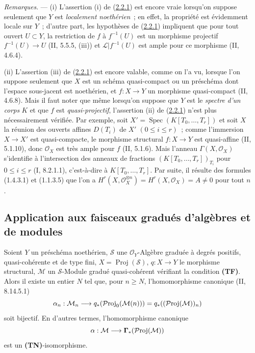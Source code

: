 \begin{env}[2.2.5]
\label{III.2.2.5-fr}
\emph{Remarques.} ---
(i) L'assertion (i) de (\hyperref[III.2.2.1-fr]{2.2.1}) est encore vraie
lorsqu'on suppose seulement que $Y$ est \emph{localement noethérien}~; en
effet, la propriété est évidemment locale sur $Y$~; d'autre part, les
hypothèses de (\hyperref[III.2.2.1-fr]{2.2.1}) impliquent que pour tout
ouvert $U\subset Y$, la restriction de $f$ à $f^{-1}(U)$ est un morphisme
projectif $f^{-1}(U)\to U$ (II, 5.5.5, (iii)) et
$\mathcal L|f^{-1}(U)$ est ample pour ce morphisme (II, 4.6.4).

(ii) L'assertion (iii) de (\hyperref[III.2.2.1-fr]{2.2.1}) est encore
valable, comme on l'a vu, lorsque l'on suppose seulement que $X$ est un
schéma quasi-compact ou un préschéma dont l'espace sous-jacent est
noethérien, et $f:X\to Y$ un morphisme quasi-compact (II, 4.6.8). Mais il
faut noter que même lorsqu'on suppose que $Y$ est le \emph{spectre d'un
corps} $K$ et que $f$ est \emph{quasi-projectif}, l'assertion (ii) de
(\hyperref[III.2.2.1-fr]{2.2.1}) n'est plus nécessairement vérifiée. Par
exemple, soit $X'=\operatorname{Spec}(K[T_0,\ldots,T_r])$ et soit $X$ la
réunion des ouverts affines $D(T_i)$ de $X'$ $(0\leq i\leq r)$~; comme
l'immersion $X\to X'$ est quasi-compacte, le morphisme structural
$f:X\to Y$ est quasi-affine (II, 5.1.10), donc $\mathcal O_X$ est très
ample pour $f$ (II, 5.1.6). Mais l'anneau
$\Gamma(X,\mathcal O_X)$ s'identifie à l'intersection des anneaux de
fractions $(K[T_0,\ldots,T_r])_{T_i}$ pour $0\leq i\leq r$
(I, 8.2.1.1), c'est-à-dire à $K[T_0,\ldots,T_r]$. Par suite, il résulte
des formules (1.4.3.1) et (1.1.3.5) que l'on a
$H^r(X,\mathcal O_X^{\otimes n})=H^r(X,\mathcal O_X)=A\neq0$ pour tout
$n$.
\end{env}

\subsection{Application aux faisceaux gradués d'algèbres et de modules}
\label{subsection:III.2.3-fr}

\begin{theorem}[2.3.1]
\label{III.2.3.1-fr}
Soient $Y$ un préschéma noethérien, $\mathcal S$ une
$\mathcal O_Y$-Algèbre graduée à degrés positifs, quasi-cohérente et de
type fini, $X=\operatorname{Proj}(\mathcal S)$,
$q:X\to Y$ le morphisme structural, $\mathcal M$ un $\mathcal S$-Module
gradué quasi-cohérent vérifiant la condition \textbf{(TF)}. Alors il existe
un entier $N$ tel que, pour $n\geq N$, l'homomorphisme canonique
(II, 8.14.5.1)
\[
\alpha_n:\mathcal M_n\longrightarrow
q_*(\mathcal{P}\mathrm{roj}_0(\mathcal M(n)))
=q_*((\mathcal{P}\mathrm{roj}(\mathcal M))_n)
\]
soit bijectif. En d'autres termes, l'homomorphisme canonique
\[
\alpha:\mathcal M\longrightarrow\boldsymbol{\Gamma}_*(\mathcal{P}\mathrm{roj}(\mathcal M))
\]
est un \textbf{(TN)}-isomorphisme.
\end{theorem}

